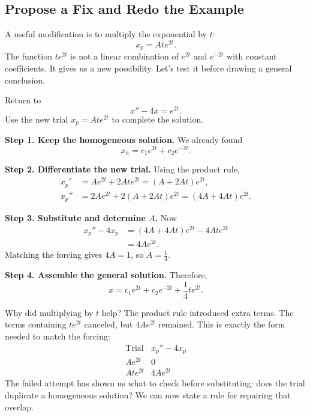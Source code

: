 \documentclass[10pt,letterpaper]{article}
\begin{document}
\subsection{Propose a Fix and Redo the Example}
A useful modification is to multiply the exponential by $t$:
\[
x_p=Ate^{2t}.
\]
The function $te^{2t}$ is not a linear combination of $e^{2t}$ and $e^{-2t}$
with constant coefficients. It gives us a new possibility.
Let's test it before drawing a general conclusion.

\begin{example}[1 continued]{Return to
\[
x''-4x=e^{2t}.
\]
Use the new trial $x_p=Ate^{2t}$ to complete the solution.
}

\textbf{Step 1. Keep the homogeneous solution.}
We already found
\[
x_h=c_1e^{2t}+c_2e^{-2t}.
\]

\textbf{Step 2. Differentiate the new trial.}
Using the product rule,
\begin{align*}
x_p'&=Ae^{2t}+2Ate^{2t}=(A+2At)e^{2t},\\
x_p''&=2Ae^{2t}+2(A+2At)e^{2t}
       =(4A+4At)e^{2t}.
\end{align*}

\textbf{Step 3. Substitute and determine $A$.}
Now
\begin{align*}
x_p''-4x_p
&=(4A+4At)e^{2t}-4Ate^{2t}\\
&=4Ae^{2t}.
\end{align*}
Matching the forcing gives $4A=1$, so $A=\frac14$.

\textbf{Step 4. Assemble the general solution.}
Therefore,
\[
\boxed{x=c_1e^{2t}+c_2e^{-2t}+\frac14te^{2t}.}
\]
\end{example}
\addtocounter{example}{-1}

Why did multiplying by $t$ help? The product rule introduced extra
terms. The terms containing $te^{2t}$ canceled, but $4Ae^{2t}$ remained.
This is exactly the form needed to match the forcing:
\[
\begin{array}{c|c}
\text{Trial} & x_p''-4x_p\\\hline
Ae^{2t} & 0\\
Ate^{2t} & 4Ae^{2t}
\end{array}
\]
The failed attempt has shown us what to check before substituting:
does the trial duplicate a homogeneous solution? We can now state
a rule for repairing that overlap.
\end{document}
